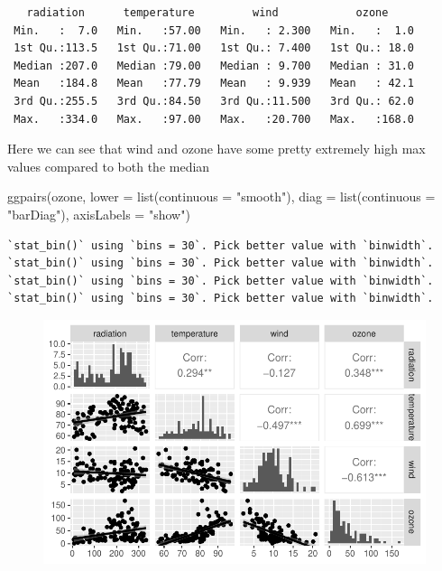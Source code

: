 \documentclass[
  a4paper,
  DIV=11,
  numbers=noendperiod]{scrartcl}
\newenvironment{Shaded}{\begin{snugshade}}{\end{snugshade}}
\newcommand{\AttributeTok}[1]{\textcolor[rgb]{0.40,0.45,0.13}{#1}}
\newcommand{\FunctionTok}[1]{\textcolor[rgb]{0.28,0.35,0.67}{#1}}
\newcommand{\NormalTok}[1]{\textcolor[rgb]{0.00,0.23,0.31}{#1}}
\newcommand{\StringTok}[1]{\textcolor[rgb]{0.13,0.47,0.30}{#1}}
\begin{document}
\begin{verbatim}
   radiation      temperature         wind            ozone      
 Min.   :  7.0   Min.   :57.00   Min.   : 2.300   Min.   :  1.0  
 1st Qu.:113.5   1st Qu.:71.00   1st Qu.: 7.400   1st Qu.: 18.0  
 Median :207.0   Median :79.00   Median : 9.700   Median : 31.0  
 Mean   :184.8   Mean   :77.79   Mean   : 9.939   Mean   : 42.1  
 3rd Qu.:255.5   3rd Qu.:84.50   3rd Qu.:11.500   3rd Qu.: 62.0  
 Max.   :334.0   Max.   :97.00   Max.   :20.700   Max.   :168.0  
\end{verbatim}

Here we can see that wind and ozone have some pretty extremely high max
values compared to both the median

\begin{Shaded}
\begin{Highlighting}[]
\FunctionTok{ggpairs}\NormalTok{(ozone, }\AttributeTok{lower =} \FunctionTok{list}\NormalTok{(}\AttributeTok{continuous =} \StringTok{"smooth"}\NormalTok{), }\AttributeTok{diag =} \FunctionTok{list}\NormalTok{(}\AttributeTok{continuous =} \StringTok{"barDiag"}\NormalTok{),}
    \AttributeTok{axisLabels =} \StringTok{"show"}\NormalTok{)}
\end{Highlighting}
\end{Shaded}

\begin{verbatim}
`stat_bin()` using `bins = 30`. Pick better value with `binwidth`.
`stat_bin()` using `bins = 30`. Pick better value with `binwidth`.
`stat_bin()` using `bins = 30`. Pick better value with `binwidth`.
`stat_bin()` using `bins = 30`. Pick better value with `binwidth`.
\end{verbatim}

\begin{figure}[H]

{\centering \includegraphics{StatsAssignment_files/figure-pdf/unnamed-chunk-6-1.pdf}

}

\end{figure}
\end{document}
